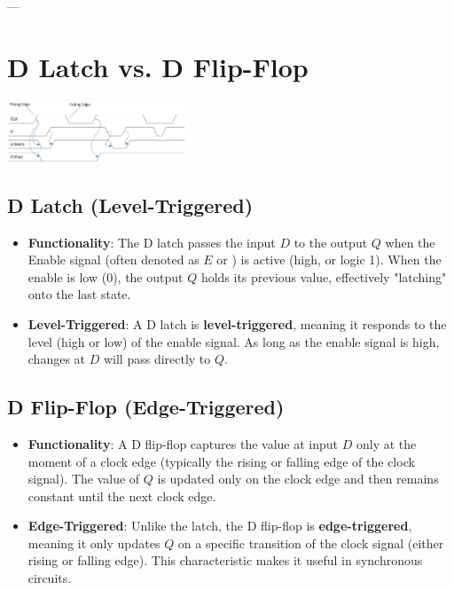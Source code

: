 \documentclass[10pt]{article}
\begin{document}
\begin{multicols*}{2}
--- %

\section{D Latch vs. D Flip-Flop}
\includegraphics[width=0.4\textwidth]{D Latch vs Flip Flop.png}
\subsection{D Latch (Level-Triggered)}
\begin{itemize}
    \item \textbf{Functionality}: The D latch passes the input \( D \) to the output \( Q \) when the Enable signal (often denoted as \( E \) or ) is active (high, or logic 1). When the enable is low (0), the output \( Q \) holds its previous value, effectively "latching" onto the last state.
    \item \textbf{Level-Triggered}: A D latch is \textbf{level-triggered}, meaning it responds to the level (high or low) of the enable signal. As long as the enable signal is high, changes at \( D \) will pass directly to \( Q \).
\end{itemize}

\subsection{D Flip-Flop (Edge-Triggered)}
\begin{itemize}
    \item \textbf{Functionality}: A D flip-flop captures the value at input \( D \) only at the moment of a clock edge (typically the rising or falling edge of the clock signal). The value of \( Q \) is updated only on the clock edge and then remains constant until the next clock edge.
    \item \textbf{Edge-Triggered}: Unlike the latch, the D flip-flop is \textbf{edge-triggered}, meaning it only updates \( Q \) on a specific transition of the clock signal (either rising or falling edge). This characteristic makes it useful in synchronous circuits.
\end{itemize}

\end{multicols*}
\end{document}
